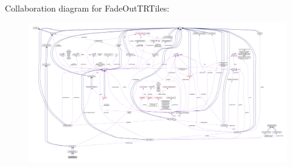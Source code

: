 Collaboration diagram for Fade\+Out\+T\+R\+Tiles\+:
\nopagebreak
\begin{figure}[H]
\begin{center}
\leavevmode
\includegraphics[width=350pt]{classFadeOutTRTiles__coll__graph}
\end{center}
\end{figure}
